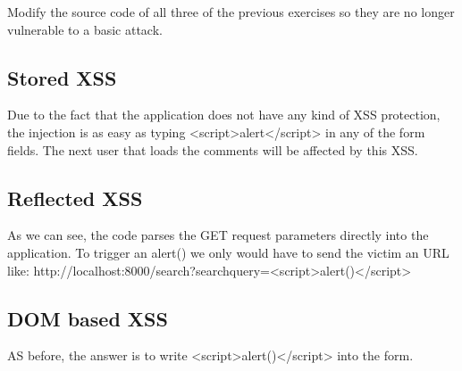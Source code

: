 \begin{Exercise}[label={websec-xss-types}]
	Modify the source code of all three of the previous exercises so they are no longer vulnerable to a basic attack.
\end{Exercise}
\begin{Answer}[ref={websec-xss-types}]
	\subsection{Stored XSS}
	Due to the fact that the application does not have any kind of XSS protection, the injection is as easy as typing <script>alert</script> in any of the form fields. The next user that loads the comments will be affected by this XSS.
	\subsection{Reflected XSS}
	As we can see, the code parses the GET request parameters directly into the application. To trigger an alert() we only would have to send the victim an URL like: http://localhost:8000/search?searchquery=<script>alert()</script>
	\subsection{DOM based XSS}
	AS before, the answer is to write <script>alert()</script> into the form.
\end{Answer}